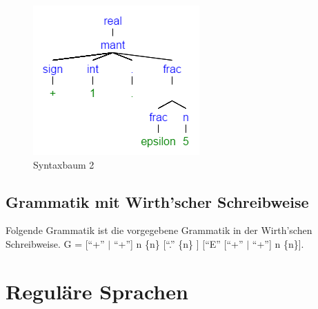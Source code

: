 \documentclass[11pt, a4paper, twoside]{article}   	%
\begin{document}
\begin{figure}[h]
\centering
\includegraphics[scale=0.8]{syntax_tree_real_2.png}
\caption{Syntaxbaum 2}
\label{fig:syntaxtree}
\end{figure}

\subsection{Grammatik mit Wirth'scher Schreibweise}
Folgende Grammatik ist die vorgegebene Grammatik in der Wirth'schen Schreibweise.
\newline
\newline
G = [\enquote{+} $|$ \enquote{+}] n \{n\} [\enquote{.} \{n\} ] [\enquote{E} [\enquote{+} $|$ \enquote{+}] n \{n\}].
\newpage

\section{Reguläre Sprachen}
\end{document}
